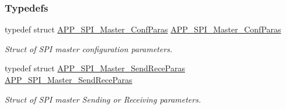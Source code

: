 \subsubsection*{Typedefs}
\begin{DoxyCompactItemize}
\item 
typedef struct \hyperlink{struct_a_p_p___s_p_i___master___conf_paras}{A\+P\+P\+\_\+\+S\+P\+I\+\_\+\+Master\+\_\+\+Conf\+Paras} \hyperlink{group___s_p_i___m_a_s_t_e_r_gacd56cb41608d0b10ce9747291a6fb4d6}{A\+P\+P\+\_\+\+S\+P\+I\+\_\+\+Master\+\_\+\+Conf\+Paras}\hypertarget{group___s_p_i___m_a_s_t_e_r_gacd56cb41608d0b10ce9747291a6fb4d6}{}\label{group___s_p_i___m_a_s_t_e_r_gacd56cb41608d0b10ce9747291a6fb4d6}

\begin{DoxyCompactList}\small\item\em Struct of S\+PI master configuration parameters. \end{DoxyCompactList}\item 
typedef struct \hyperlink{struct_a_p_p___s_p_i___master___send_rece_paras}{A\+P\+P\+\_\+\+S\+P\+I\+\_\+\+Master\+\_\+\+Send\+Rece\+Paras} \hyperlink{group___s_p_i___m_a_s_t_e_r_ga180f68de2953fff3eb6e05b02d47f3c9}{A\+P\+P\+\_\+\+S\+P\+I\+\_\+\+Master\+\_\+\+Send\+Rece\+Paras}\hypertarget{group___s_p_i___m_a_s_t_e_r_ga180f68de2953fff3eb6e05b02d47f3c9}{}\label{group___s_p_i___m_a_s_t_e_r_ga180f68de2953fff3eb6e05b02d47f3c9}

\begin{DoxyCompactList}\small\item\em Struct of S\+PI master Sending or Receiving parameters. \end{DoxyCompactList}\end{DoxyCompactItemize}
